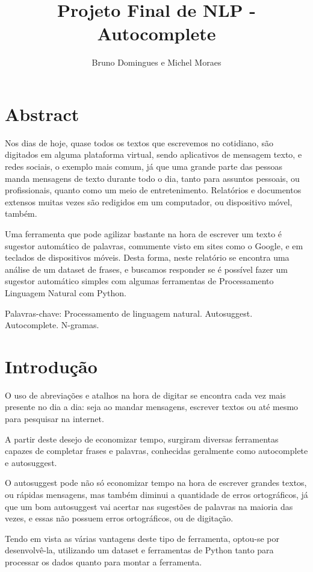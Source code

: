 \documentclass[a4paper,11pt,final]{article}
\title{Projeto Final de NLP - Autocomplete}
\author{Bruno Domingues e Michel Moraes}
\begin{document}
\maketitle

\section{Abstract}

Nos dias de hoje, quase todos os textos que escrevemos no cotidiano, são digitados em alguma plataforma virtual, sendo aplicativos de mensagem texto, e redes sociais, o exemplo mais comum, já que uma grande parte das pessoas manda mensagens de texto durante todo o dia, tanto para assuntos pessoais, ou profissionais, quanto como um meio de entretenimento. Relatórios e documentos extensos muitas vezes são redigidos em um computador, ou dispositivo móvel, também.

Uma ferramenta que pode agilizar bastante na hora de escrever um texto é sugestor automático de palavras, comumente visto em sites como o Google, e em teclados de dispositivos móveis. Desta forma, neste relatório se encontra uma análise de um dataset de frases, e buscamos responder se é possível fazer um sugestor automático simples com algumas ferramentas de Processamento Linguagem Natural com Python.

Palavras-chave: Processamento de linguagem natural. Autosuggest. Autocomplete. N-gramas.


\section{Introdução}

O uso de abreviações e atalhos na hora de digitar se encontra cada vez mais presente no dia a dia: seja ao mandar mensagens, escrever textos ou até mesmo para pesquisar na internet.

A partir deste desejo de economizar tempo, surgiram diversas ferramentas capazes de completar frases e palavras, conhecidas geralmente como autocomplete e autosuggest.

O autosuggest pode não só economizar tempo na hora de escrever grandes textos, ou rápidas mensagens, mas também diminui a quantidade de erros ortográficos, já que um bom autosuggest vai acertar nas sugestões de palavras na maioria das vezes, e essas não possuem erros ortográficos, ou de digitação.

Tendo em vista as várias vantagens deste tipo de ferramenta, optou-se por desenvolvê-la, utilizando um dataset e ferramentas de Python tanto para processar os dados quanto para montar a ferramenta.
\end{document}
